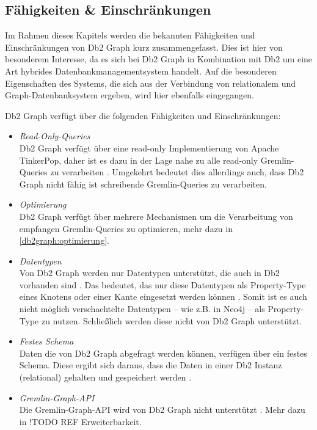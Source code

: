 \subsection{Fähigkeiten \& Einschränkungen}
Im Rahmen dieses Kapitels werden die bekannten Fähigkeiten und Einschränkungen von Db2 Graph kurz zusammengefasst. Dies ist hier von besonderem Interesse, da es sich bei Db2 Graph in Kombination mit Db2 um eine Art hybrides Datenbankmanagementsystem handelt. Auf die besonderen Eigenschaften des Systems, die sich aus der Verbindung von relationalem und Graph-Datenbanksystem ergeben, wird hier ebenfalls eingegangen. 

Db2 Graph verfügt über die folgenden Fähigkeiten und Einschränkungen:

\begin{itemize}
    \item \textit{Read-Only-Queries}\\
    Db2 Graph verfügt über eine read-only Implementierung von Apache TinkerPop, daher ist es dazu in der Lage nahe zu alle read-only Gremlin-Queries zu verarbeiten \cite{ibm_docs_limitiations}. Umgekehrt bedeutet dies allerdings auch, dass Db2 Graph nicht fähig ist schreibende Gremlin-Queries zu verarbeiten.
    \item \textit{Optimierung}\\
    Db2 Graph verfügt über mehrere Mechanismen um die Verarbeitung von empfangen Gremlin-Queries zu optimieren, mehr dazu in \autoref{db2graph:optimierung}.
    \item \textit{Datentypen}\\
    Von Db2 Graph werden nur Datentypen unterstützt, die auch in Db2 vorhanden sind \cite{ibm_docs_limitiations}. Das bedeutet, das nur diese Datentypen als Property-Type eines Knotens oder einer Kante eingesetzt werden können \cite{ibm_docs_limitiations}. Somit ist es auch nicht möglich verschachtelte Datentypen -- wie z.B. in Neo4j -- als Property-Type zu nutzen. Schließlich werden diese nicht von Db2 Graph unterstützt.
    \item \textit{Festes Schema}\\
    Daten die von Db2 Graph abgefragt werden können, verfügen über ein festes Schema. Diese ergibt sich daraus, dass die Daten in einer Db2 Instanz (relational) gehalten und gespeichert werden \cite{sigmod_tian,vldb_tian,yt_tian}.
    \item \textit{Gremlin-Graph-API}\\
    Die Gremlin-Graph-API wird von Db2 Graph nicht unterstützt \cite{ibm_docs_limitiations}. Mehr dazu in !TODO REF Erweiterbarkeit.
\end{itemize}

